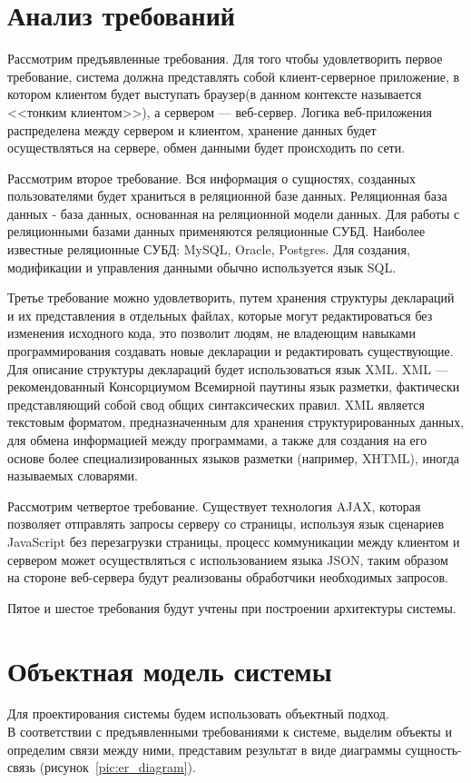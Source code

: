 \documentclass[14pt,a4paper]{reportmod}
\begin{document}
\section{Анализ требований}
Рассмотрим предъявленные требования. Для того чтобы удовлетворить первое требование, система должна представлять собой клиент-серверное приложение, в котором клиентом будет выступать браузер(в данном контексте называется  <<тонким клиентом>>), а сервером --- веб-сервер. Логика веб-приложения распределена между сервером и клиентом, хранение данных будет осуществляться на сервере, обмен данными будет происходить по сети.


Рассмотрим второе требование. Вся информация о сущностях, созданных пользователями будет храниться в реляционной базе данных. Реляционная база данных - база данных, основанная на реляционной модели данных. Для работы с реляционными базами данных применяются реляционные СУБД. Наиболее известные реляционные СУБД: MySQL, Oracle, Postgres. Для создания, модификации и управления данными обычно используется язык SQL.

Третье требование можно удовлетворить, путем хранения структуры деклараций и их представления в отдельных файлах, которые могут редактироваться без изменения исходного кода, это позволит людям, не владеющим навыками программирования создавать новые декларации и редактировать существующие. Для описание структуры деклараций будет использоваться язык XML. XML --- рекомендованный Консорциумом Всемирной паутины язык разметки, фактически представляющий собой свод общих синтаксических правил. XML является текстовым форматом, предназначенным для хранения структурированных данных, для обмена информацией между программами, а также для создания на его основе более специализированных языков разметки (например, XHTML), иногда называемых словарями.

Рассмотрим четвертое требование. Существует технология AJAX, которая позволяет отправлять запросы серверу со страницы, используя язык сценариев JavaScript без перезагрузки страницы, процесс коммуникации между клиентом и сервером может осуществляться с использованием языка JSON, таким образом на стороне веб-сервера будут реализованы обработчики необходимых запросов.


Пятое и шестое требования будут учтены при построении архитектуры системы.

\section{Объектная модель системы}
Для проектирования системы будем использовать объектный подход.\\
В соответствии с предъявленными требованиями к системе, выделим объекты и определим связи между ними, представим результат в виде диаграммы сущность-связь (рисунок~\ref{pic:er_diagram}).
\end{document}
